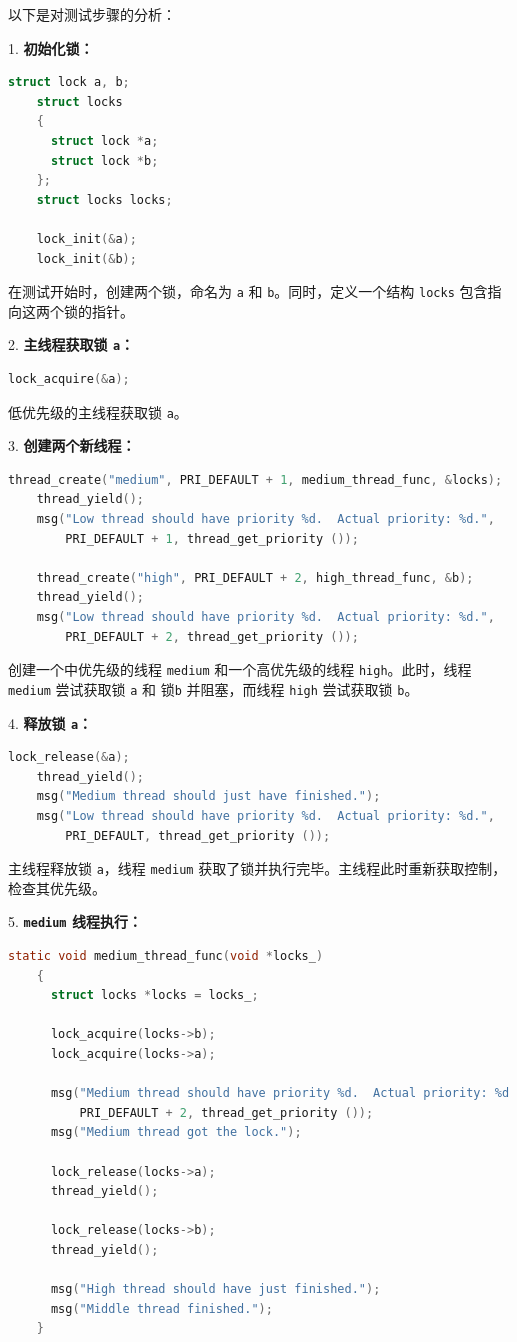 \documentclass{article}
\begin{document}
以下是对测试步骤的分析：

1. \textbf{初始化锁：}
\begin{lstlisting}[language=C]
    struct lock a, b;
    struct locks 
    {
      struct lock *a;
      struct lock *b;
    };
    struct locks locks;

    lock_init(&a);
    lock_init(&b);
\end{lstlisting}

在测试开始时，创建两个锁，命名为 \texttt{a} 和 \texttt{b}。同时，定义一个结构 \texttt{locks} 包含指向这两个锁的指针。

2. \textbf{主线程获取锁 \texttt{a}：}
\begin{lstlisting}[language=C]
    lock_acquire(&a);
\end{lstlisting}

低优先级的主线程获取锁 \texttt{a}。

3. \textbf{创建两个新线程：}
\begin{lstlisting}[language=C]
    thread_create("medium", PRI_DEFAULT + 1, medium_thread_func, &locks);
    thread_yield();
    msg("Low thread should have priority %d.  Actual priority: %d.",
        PRI_DEFAULT + 1, thread_get_priority ());

    thread_create("high", PRI_DEFAULT + 2, high_thread_func, &b);
    thread_yield();
    msg("Low thread should have priority %d.  Actual priority: %d.",
        PRI_DEFAULT + 2, thread_get_priority ());
\end{lstlisting}

创建一个中优先级的线程 \texttt{medium} 和一个高优先级的线程 \texttt{high}。此时，线程 \texttt{medium} 尝试获取锁 \texttt{a} 和 锁\texttt{b} 并阻塞，而线程 \texttt{high} 尝试获取锁 \texttt{b}。

4. \textbf{释放锁 \texttt{a}：}
\begin{lstlisting}[language=C]
    lock_release(&a);
    thread_yield();
    msg("Medium thread should just have finished.");
    msg("Low thread should have priority %d.  Actual priority: %d.",
        PRI_DEFAULT, thread_get_priority ());
\end{lstlisting}

主线程释放锁 \texttt{a}，线程 \texttt{medium} 获取了锁并执行完毕。主线程此时重新获取控制，检查其优先级。

5. \textbf{\texttt{medium} 线程执行：}
\begin{lstlisting}[language=C]
    static void medium_thread_func(void *locks_) 
    {
      struct locks *locks = locks_;

      lock_acquire(locks->b);
      lock_acquire(locks->a);

      msg("Medium thread should have priority %d.  Actual priority: %d.",
          PRI_DEFAULT + 2, thread_get_priority ());
      msg("Medium thread got the lock.");

      lock_release(locks->a);
      thread_yield();

      lock_release(locks->b);
      thread_yield();

      msg("High thread should have just finished.");
      msg("Middle thread finished.");
    }
\end{lstlisting}
\end{document}
